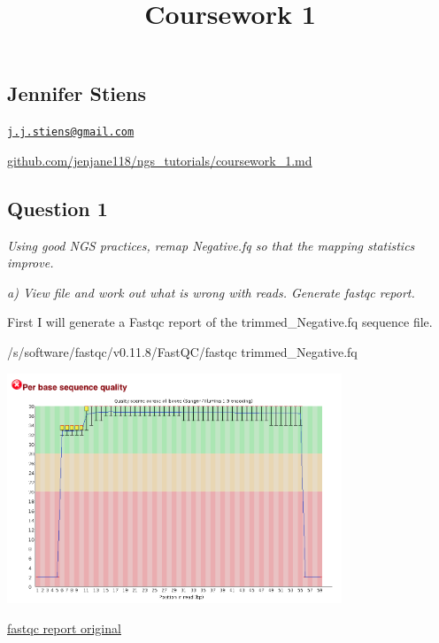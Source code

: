 \documentclass[]{article}
\title{Coursework 1}
\author{}
\date{}
\newenvironment{Shaded}{\begin{snugshade}}{\end{snugshade}}
\newcommand{\ExtensionTok}[1]{#1}
\newcommand{\NormalTok}[1]{#1}
\begin{document}
\maketitle

\subsection{Jennifer Stiens}\label{jennifer-stiens}

\href{mailto:j.j.stiens@gmail.com}{\nolinkurl{j.j.stiens@gmail.com}}

\href{https://github.com/jenjane118/ngs_tutorials}{github.com/jenjane118/ngs\_tutorials/coursework\_1.md}

\subsection{Question 1}\label{question-1}

\emph{Using good NGS practices, remap Negative.fq so that the mapping
statistics improve.}

\emph{a) View file and work out what is wrong with reads. Generate
fastqc report.}

First I will generate a Fastqc report of the trimmed\_Negative.fq
sequence file.

\begin{Shaded}
\begin{Highlighting}[]
\ExtensionTok{/s/software/fastqc/v0.11.8/FastQC/fastqc}\NormalTok{ trimmed_Negative.fq}
\end{Highlighting}
\end{Shaded}

\includegraphics[width=0.75000\textwidth]{trimmed_Negative_fastqc.png}

\href{/d/projects/u/sj003/course_materials/fastq/coursework_1/trimmed_Negative_fastqc.html}{fastqc
report original}
\end{document}
